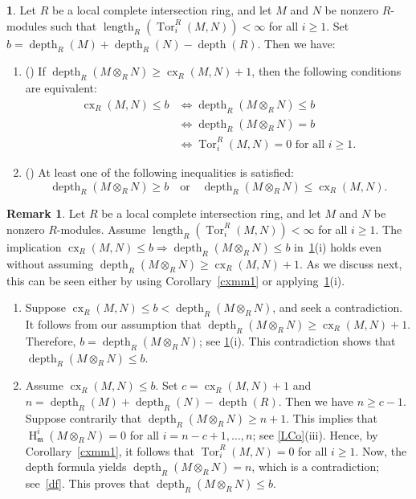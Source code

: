 \documentclass[11pt]{amsart}
\theoremstyle{definition}
\theoremstyle{definition}
\newtheorem{rmk}[thm]{Remark}
\newtheorem{chunk}[thm]{\hspace*{-1.065ex}\bf}
\numberwithin{equation}{section}
\newcommand{\fm}{\mathfrak{m}}
\DeclareMathOperator{\cx}{cx}
\DeclareMathOperator{\depth}{depth}
\DeclareMathOperator{\hh}{H}
\DeclareMathOperator{\len}{length}
\DeclareMathOperator{\Tor}{Tor}
\begin{document}
\begin{chunk} \label{cst} Let \( R \) be a local complete intersection ring, and let $M$ and $N$ be nonzero $R$-modules such that $\len_R\left(\Tor_i^R(M, N)\right)<\infty$ for all $i \geq 1$. Set $b=\depth_R(M) + \depth_R(N) - \depth(R)$.
Then we have:
\begin{enumerate}[\rm(i)]
\item (\cite[3.1]{CST}) If $\depth_R(M \otimes_R N) \geq \cx_R(M, N)+1$, then the following conditions are equivalent:\smallskip
\begin{equation*}
\begin{aligned}
\cx_R(M, N) \leq b &\Longleftrightarrow  \depth_R(M \otimes_R N) \leq b \\
&\Longleftrightarrow \depth_R(M \otimes_R N) =b\\
&\Longleftrightarrow \Tor_i^R(M, N) = 0 \text{ for all } i \geq 1.
\end{aligned}
\end{equation*}
\item (\cite[4.1]{CST}) At least one of the following inequalities is satisfied:
\[
\depth_R(M \otimes_R N) \geq b \quad \text{or} \quad \depth_R(M \otimes_R N) \leq \cx_R(M, N).
\]
\end{enumerate}
\end{chunk}

\begin{rmk} \label{boundedbounded} Let $R$ be a local complete intersection ring, and let $M$ and $N$ be nonzero $R$-modules. Assume $\len_R\left(\Tor_i^R(M, N)\right)<\infty$ for all $i \geq 1$. The implication $\cx_R(M, N) \leq b \Longrightarrow \depth_R(M \otimes_R N) \leq b$ in~\ref{cst}(i) holds even without assuming $\depth_R(M \otimes_R N) \geq \cx_R(M, N)+1$. As we discuss next, this can be seen either by using Corollary~\ref{cxmm1} or applying~\ref{cst}(i).
\begin{enumerate}[\rm(i)]
\item Suppose $\cx_R(M,N) \leq b<\depth_R(M\otimes_RN)$, and seek a contradiction. It follows from our assumption that $\depth_R(M\otimes_RN)\geq \cx_R(M,N)+1$. Therefore, $b=\depth_R(M\otimes_RN)$; see \ref{cst}(i). This contradiction shows that $\depth_R(M\otimes_RN)\leq b$.
\smallskip
\item Assume $\cx_R(M, N) \leq b$. Set $c= \cx_R(M,N)+1$ and $n=\depth_R(M)+\depth_R(N)-\depth(R)$. Then we have $n\geq c-1$. Suppose contrarily that $\depth_R(M\otimes_RN)\geq n+1$. This implies that $\hh^i_{\fm}(M\otimes_RN)=0$ for all $i=n-c+1, \ldots, n$; see \ref{LCo}(iii). Hence, by Corollary~\ref{cxmm1},  it follows that $\Tor_i^R(M,N)=0$ for all $i\geq 1$. Now, the depth formula yields $\depth_R(M\otimes_RN)=n$, which is a contradiction; see~\ref{df}. This proves that $\depth_R(M\otimes_RN)\leq b$.
\end{enumerate}
\end{rmk}
\end{document}
